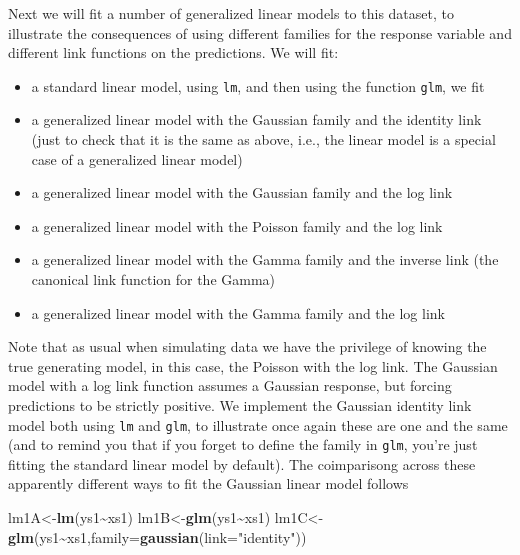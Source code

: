 \documentclass[
]{book}
\newenvironment{Shaded}{\begin{snugshade}}{\end{snugshade}}
\newcommand{\AttributeTok}[1]{\textcolor[rgb]{0.13,0.29,0.53}{#1}}
\newcommand{\FunctionTok}[1]{\textcolor[rgb]{0.13,0.29,0.53}{\textbf{#1}}}
\newcommand{\NormalTok}[1]{#1}
\newcommand{\OtherTok}[1]{\textcolor[rgb]{0.56,0.35,0.01}{#1}}
\newcommand{\SpecialCharTok}[1]{\textcolor[rgb]{0.81,0.36,0.00}{\textbf{#1}}}
\newcommand{\StringTok}[1]{\textcolor[rgb]{0.31,0.60,0.02}{#1}}
\providecommand{\tightlist}{%
  \setlength{\itemsep}{0pt}\setlength{\parskip}{0pt}}
\begin{document}
Next we will fit a number of generalized linear models to this dataset, to illustrate the consequences of using different families for the response variable and different link functions on the predictions. We will fit:

\begin{itemize}
\tightlist
\item
  a standard linear model, using \texttt{lm}, and then using the function \texttt{glm}, we fit
\item
  a generalized linear model with the Gaussian family and the identity link (just to check that it is the same as above, i.e., the linear model is a special case of a generalized linear model)
\item
  a generalized linear model with the Gaussian family and the log link
\item
  a generalized linear model with the Poisson family and the log link
\item
  a generalized linear model with the Gamma family and the inverse link (the canonical link function for the Gamma)
\item
  a generalized linear model with the Gamma family and the log link
\end{itemize}

Note that as usual when simulating data we have the privilege of knowing the true generating model, in this case, the Poisson with the log link. The Gaussian model with a log link function assumes a Gaussian response, but forcing predictions to be strictly positive. We implement the Gaussian identity link model both using \texttt{lm} and \texttt{glm}, to illustrate once again these are one and the same (and to remind you that if you forget to define the family in \texttt{glm}, you're just fitting the standard linear model by default). The coimparisong across these apparently different ways to fit the Gaussian linear model follows

\begin{Shaded}
\begin{Highlighting}[]
\NormalTok{lm1A}\OtherTok{\textless{}{-}}\FunctionTok{lm}\NormalTok{(ys1}\SpecialCharTok{\textasciitilde{}}\NormalTok{xs1)}
\NormalTok{lm1B}\OtherTok{\textless{}{-}}\FunctionTok{glm}\NormalTok{(ys1}\SpecialCharTok{\textasciitilde{}}\NormalTok{xs1) }
\NormalTok{lm1C}\OtherTok{\textless{}{-}}\FunctionTok{glm}\NormalTok{(ys1}\SpecialCharTok{\textasciitilde{}}\NormalTok{xs1,}\AttributeTok{family=}\FunctionTok{gaussian}\NormalTok{(}\AttributeTok{link=}\StringTok{"identity"}\NormalTok{))}
\end{Highlighting}
\end{Shaded}
\end{document}
